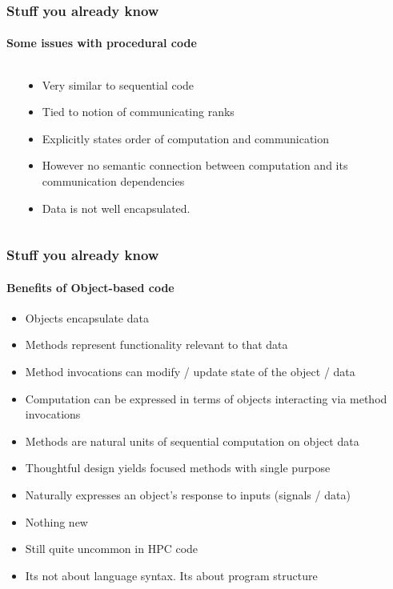 \begin{frame}[fragile]
\frametitle{Stuff you already know}
\framesubtitle{Some issues with procedural code}

  \begin{columns}
    \begin{column}{0.4\textwidth}
      
    \end{column}
    \begin{column}{0.6\textwidth}
      \begin{itemize}
      \item Very similar to sequential code
      \item Tied to notion of communicating ranks
      \item Explicitly states order of computation and communication
      \item However no semantic connection between computation and its communication dependencies
      \item Data is not well encapsulated.
      \end{itemize}
    \end{column}
  \end{columns}

\end{frame}


\begin{frame}[shrink]
\frametitle{Stuff you already know}
\framesubtitle{Benefits of Object-based code}
    \begin{itemize}
        \item Objects encapsulate data
        \item Methods represent functionality relevant to that data
        \item Method invocations can modify / update state of the object / data
        \item Computation can be expressed in terms of objects interacting via method invocations
    \end{itemize}
    \begin{block}{}
    \begin{itemize}
        \item Methods are natural units of sequential computation on object data
        \item Thoughtful design yields focused methods with single purpose
        \item Naturally expresses an object's response to inputs (signals / data)
    \end{itemize}
    \end{block}
    \begin{itemize}
        \item Nothing new
        \item Still quite uncommon in HPC code
        \item Its not about language syntax. Its about program structure
    \end{itemize}
\end{frame}
